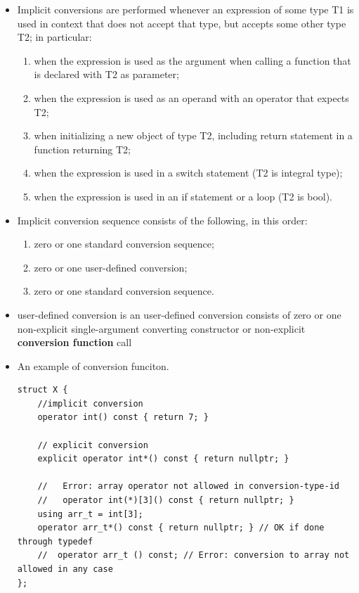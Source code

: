 \documentclass[a4paper,11pt,twoside]{book}
\begin{document}
\begin{itemize}
	\item Implicit conversions are performed whenever an expression of some type T1 is used in context that does not accept that type, but accepts some other type T2; in particular:
	\begin{enumerate}
		\item when the expression is used as the argument when calling a function that is declared with T2 as parameter;
		\item when the expression is used as an operand with an operator that expects T2;
		\item when initializing a new object of type T2, including return statement in a function returning T2;
		\item when the expression is used in a switch statement (T2 is integral type);
		\item when the expression is used in an if statement or a loop (T2 is bool).
	\end{enumerate}
	
	\item Implicit conversion sequence consists of the following, in this order:
	\begin{enumerate}
		\item zero or one standard conversion sequence;
		\item zero or one user-defined conversion;
		\item zero or one standard conversion sequence.
	\end{enumerate}
	\item user-defined conversion is an user-defined conversion consists of zero or one non-explicit single-argument converting constructor or non-explicit \textbf{conversion function} call
	
	\item An example of conversion funciton. 
\begin{lstlisting}[numbers=none]	
struct X {
	//implicit conversion
	operator int() const { return 7; }
	
	// explicit conversion
	explicit operator int*() const { return nullptr; }
	
	//   Error: array operator not allowed in conversion-type-id
	//   operator int(*)[3]() const { return nullptr; }
	using arr_t = int[3];
	operator arr_t*() const { return nullptr; } // OK if done through typedef
	//  operator arr_t () const; // Error: conversion to array not allowed in any case
};
\end{lstlisting}	
	

\end{itemize}
\end{document}
